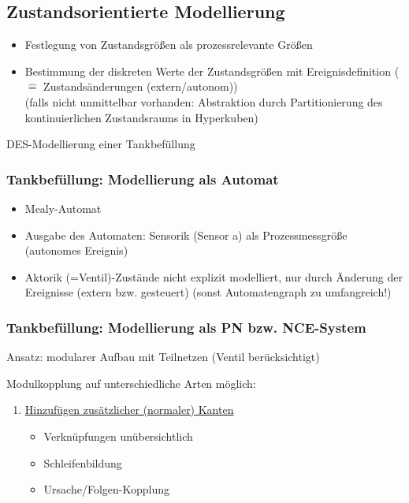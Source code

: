 \subsection{Zustandsorientierte Modellierung}
\begin{itemize}
	\item Festlegung von Zustandsgrößen  als prozessrelevante Größen
	\item Bestimmung der diskreten Werte der Zustandsgrößen mit Ereignisdefinition ($\hat{=}$ Zustandsänderungen (extern/autonom))\\
	(falls nicht unmittelbar vorhanden: Abstraktion durch Partitionierung des kontinuierlichen Zustandsraums in Hyperkuben)
\end{itemize}

 DES-Modellierung einer Tankbefüllung 

\subsubsection{Tankbefüllung: Modellierung als Automat}


\begin{itemize}
	\item Mealy-Automat
	\item Ausgabe des Automaten: Sensorik (Sensor a) als Prozessmessgröße (autonomes Ereignis)
	\item Aktorik (=Ventil)-Zustände nicht explizit modelliert, nur durch Änderung der Ereignisse (extern bzw. gesteuert) (sonst Automatengraph zu umfangreich!)
\end{itemize}

\subsubsection{Tankbefüllung: Modellierung als PN bzw. NCE-System}
Ansatz: modularer Aufbau mit Teilnetzen (Ventil berücksichtigt) 

Modulkopplung auf unterschiedliche Arten möglich:
\begin{enumerate}
	\item \underline{Hinzufügen zusätzlicher (normaler) Kanten} 
	
	\begin{itemize}
		\item Verknüpfungen unübersichtlich
		\item Schleifenbildung
		\item Ursache/Folgen-Kopplung
	\end{itemize}
\end{enumerate}


